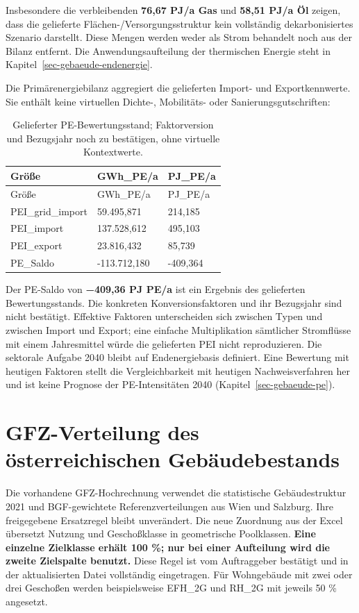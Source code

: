 \documentclass[
  ngerman,
  a4paper,
  DIV=11]{scrreprt}
\begin{document}
Insbesondere die verbleibenden \textbf{76,67 PJ/a Gas} und \textbf{58,51
PJ/a Öl} zeigen, dass die gelieferte Flächen-/Versorgungsstruktur kein
vollständig dekarbonisiertes Szenario darstellt. Diese Mengen werden
weder als Strom behandelt noch aus der Bilanz entfernt. Die
Anwendungsaufteilung der thermischen Energie steht in
Kapitel~\ref{sec-gebaeude-endenergie}.

Die Primärenergiebilanz aggregiert die gelieferten Import- und
Exportkennwerte. Sie enthält keine virtuellen Dichte-, Mobilitäts- oder
Sanierungsgutschriften:

\begin{longtable}[]{@{}lll@{}}
\caption{Gelieferter PE-Bewertungsstand; Faktorversion und Bezugsjahr
noch zu bestätigen, ohne virtuelle
Kontextwerte.}\label{tbl-gebaeude-pe}\tabularnewline
\toprule\noalign{}
Größe & GWh\_PE/a & PJ\_PE/a \\
\midrule\noalign{}
\endfirsthead
\toprule\noalign{}
Größe & GWh\_PE/a & PJ\_PE/a \\
\midrule\noalign{}
\endhead
\bottomrule\noalign{}
\endlastfoot
PEI\_grid\_import & 59.495,871 & 214,185 \\
PEI\_import & 137.528,612 & 495,103 \\
PEI\_export & 23.816,432 & 85,739 \\
PE\_Saldo & -113.712,180 & -409,364 \\
\end{longtable}

Der PE-Saldo von \textbf{−409,36 PJ PE/a} ist ein Ergebnis des
gelieferten Bewertungsstands. Die konkreten Konversionsfaktoren und ihr
Bezugsjahr sind nicht bestätigt. Effektive Faktoren unterscheiden sich
zwischen Typen und zwischen Import und Export; eine einfache
Multiplikation sämtlicher Stromflüsse mit einem Jahresmittel würde die
gelieferten PEI nicht reproduzieren. Die sektorale Aufgabe 2040 bleibt
auf Endenergiebasis definiert. Eine Bewertung mit heutigen Faktoren
stellt die Vergleichbarkeit mit heutigen Nachweisverfahren her und ist
keine Prognose der PE-Intensitäten 2040 (Kapitel~\ref{sec-gebaeude-pe}).

\section{GFZ-Verteilung des österreichischen
Gebäudebestands}\label{sec-gfz-verteilung}

Die vorhandene GFZ-Hochrechnung verwendet die statistische
Gebäudestruktur 2021 und BGF-gewichtete Referenzverteilungen aus Wien
und Salzburg. Ihre freigegebene Ersatzregel bleibt unverändert. Die neue
Zuordnung aus der Excel übersetzt Nutzung und Geschoßklasse in
geometrische Poolklassen. \textbf{Eine einzelne Zielklasse erhält 100
\%; nur bei einer Aufteilung wird die zweite Zielspalte benutzt.} Diese
Regel ist vom Auftraggeber bestätigt und in der aktualisierten Datei
vollständig eingetragen. Für Wohngebäude mit zwei oder drei Geschoßen
werden beispielsweise EFH\_2G und RH\_2G mit jeweils 50 \% angesetzt.
\end{document}
